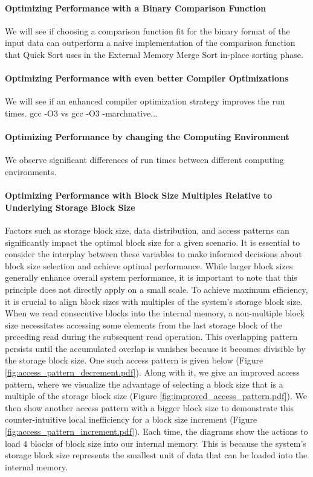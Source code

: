 \documentclass[twocolumn]{article}
\begin{document}
\paragraph*{Optimizing Performance with a Binary Comparison Function}
We will see if choosing a comparison function fit for the binary format of the input data can outperform a naive implementation of the comparison function that Quick Sort uses
in the External Memory Merge Sort in-place sorting phase.

\paragraph*{Optimizing Performance with even better Compiler Optimizations}
We will see if an enhanced compiler optimization strategy improves the run times.
gcc -O3 vs gcc -O3 -marchnative...

\paragraph*{Optimizing Performance by changing the Computing Environment}
We observe significant differences of run times between different computing environments.

\paragraph*{Optimizing Performance with Block Size Multiples Relative to Underlying Storage Block Size}
Factors such as storage block size, data distribution, and access patterns can significantly impact the optimal block size for a given scenario.
It is essential to consider the interplay between these variables to make informed decisions about block size selection and achieve optimal performance.
While larger block sizes generally enhance overall system performance, it is important to note that this principle does not directly apply on a small scale.
To achieve maximum efficiency, it is crucial to align block sizes with multiples of the system's storage block size.
When we read consecutive blocks into the internal memory, a non-multiple block size necessitates accessing some elements from the last storage block of the
preceding read during the subsequent read operation.
This overlapping pattern persists until the accumulated overlap is vanishes because it becomes divisible by the storage block size.
One such access pattern is given below (Figure \ref{fig:access_pattern_decrement.pdf}). Along with it, we give an improved access pattern, where we visualize the advantage of selecting
a block size that is a multiple of the storage block size (Figure \ref{fig:improved_access_pattern.pdf}). We then show another access pattern with a bigger block size to demonstrate
this counter-intuitive local inefficiency for a block size increment (Figure \ref{fig:access_pattern_increment.pdf}). Each time, the diagrams show the actions to load \( 4 \) blocks of block size
into our internal memory.
This is because the system's storage block size represents the smallest unit of data that can be loaded into the internal memory.
\end{document}
